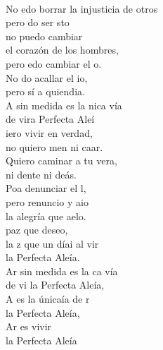 \begin{cancion}%
	   \chord{(}{**)}{    }\\
	No edo borrar la injusticia de otros\\
	pero do ser sto \\
no puedo cambiar \\
el corazón de los hombres, \\
	pero edo cambiar el o. \\
	No do acallar el io, \\
	pero sí  a quiendia.\\
	A sin medida es la nica vía \\
	de vira Perfecta Aleí  \chord{(}{**)}{    }\\
	iero vivir en verdad, \\
	no quiero men ni caar.\\
Quiero caminar a tu vera,\\
	ni dente ni deás.\\
	Poa denunciar el l,  \\
	pero renuncio y aio \\
	la alegría que aelo.\\
	paz que deseo, \\
	la z que un díai al vir\\
	la Perfecta Aleía.   \chord{(}{**)}{    }\\
	Ar sin medida es la ca vía \\
	de vi la Perfecta Aleía,\\
	A es la únicaía de r \\
	la Perfecta Aleía,\\
	Ar es vivir  \\
	la Perfecta Aleía  \chord{(}{**)}{    }\\
\end{cancion}%
